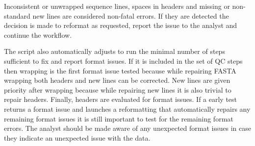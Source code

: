 Inconsistent or unwrapped sequence lines, spaces in headers and missing or non-standard new lines are considered non-fatal errors. If they are detected the decision is made to reformat as requested, report the issue to the analyst and continue the workflow.

The script also automatically adjusts to run the minimal number of steps sufficient to fix and report format issues. If it is included in the set of QC steps then wrapping is the first format issue tested because while repairing FASTA wrapping both headers and new lines can be corrected. New lines are given priority after wrapping because while repairing new lines it is also trivial to repair headers. Finally, headers are evaluated for format issues. If a early test returns a format issue and launches a reformatting that automatically repairs any remaining format issues it is still important to test for the remaining format errors. The analyst should be made aware of any unexpected format issues in case they indicate an unexpected issue with the data.
  
  
  
  
  